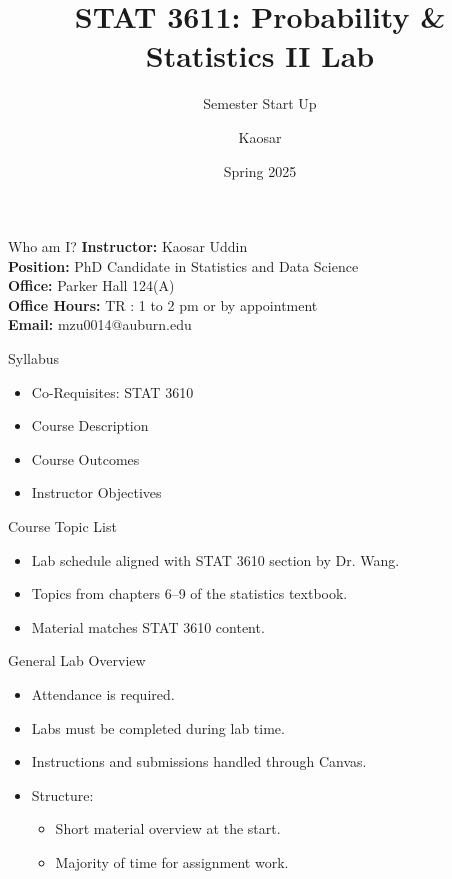 \documentclass{beamer}
\title{STAT 3611: Probability \& Statistics II Lab}
\subtitle{Semester Start Up}
\author{Kaosar}
\institute{Auburn University}
\date{Spring 2025}
\begin{document}
\frame{\titlepage}

\begin{frame}{Who am I?}
\textbf{Instructor:} Kaosar Uddin\\
\textbf{Position:} PhD Candidate in Statistics and Data Science\\
\textbf{Office:} Parker Hall 124(A)\\
\textbf{Office Hours:} TR : 1 to 2 pm or by appointment\\
\textbf{Email:} mzu0014@auburn.edu

\end{frame}
\begin{frame}{Syllabus}
\begin{itemize}
    \item Co-Requisites: STAT 3610
    \item Course Description 
    \item Course Outcomes 
    \item Instructor Objectives 
\end{itemize}
\end{frame}
 
\begin{frame}{Course Topic List}
\begin{itemize}
    \item Lab schedule aligned with STAT 3610 section by Dr. Wang.
    \item Topics from chapters 6--9 of the statistics textbook.
    \item Material matches STAT 3610 content.
\end{itemize}
\end{frame}

\begin{frame}{General Lab Overview}
\begin{itemize}
    \item Attendance is required.
    \item Labs must be completed during lab time.
    \item Instructions and submissions handled through Canvas.
    \item Structure:
    \begin{itemize}
        \item Short material overview at the start.
        \item Majority of time for assignment work.
    \end{itemize}
\end{itemize}
\end{frame}
\end{document}
